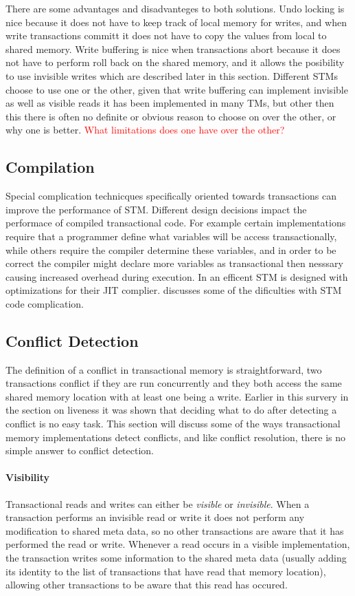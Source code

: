 There are some advantages and disadvanteges to both solutions.
Undo locking is nice because it does not have to keep track of local memory for writes,
 and when write transactions committ it does not have to copy the values from local to shared memory.
Write buffering is nice when transactions abort because it does not have to perform roll back on the shared memory,
 and it allows the posibility to use invisible writes which are described later in this section.
Different STMs choose to use one or the other, given that write buffering can implement
 invisible as well as visible reads it has been implemented in many TMs, but other then this there 
is often no definite or obvious reason to choose on over the other, or why one is better.
\textcolor{Red}{What limitations does one have over the other?}

\subsection{Compilation}
Special complication technicques specifically oriented towards transactions can improve the performance of STM.
Different design decisions impact the performace of compiled transactional code.
For example certain implementations require that a programmer define what variables will be
 access transactionally, while others require the compiler determine these variables, and in order
 to be correct the compiler might declare more variables as transactional then nesssary causing increased overhead during execution.
In \cite{1133985} an efficent STM is designed with optimizations for their JIT complier.
\cite{LPD-REPORT-2009-003} discusses some of the dificulties with STM code complication.



\subsection{Conflict Detection}
The definition of a conflict in transactional memory is straightforward, two 
transactions conflict if they are run concurrently and they both access the same 
shared memory location with at least one being a write.
Earlier in this survery in the section on liveness it was shown that deciding
 what to do after detecting a conflict is no easy task.
This section will discuss some of the ways transactional memory implementations
 detect conflicts, and like conflict resolution, there is no simple answer to conflict detection.


\paragraph{Visibility}
Transactional reads and writes can either be \emph{visible} or \emph{invisible}.
When a transaction performs an invisible read or write it does not perform any 
modification to shared meta data, so no other transactions are aware that it has performed the read or write.
Whenever a read occurs in a visible implementation, the transaction writes some 
information to the shared meta data (usually adding its identity to the list 
of transactions that have read that memory location), allowing other 
transactions to be aware that this read has occured.

